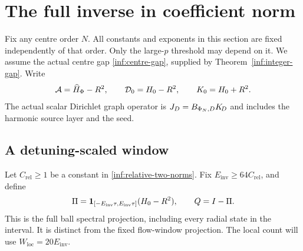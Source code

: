 \section{The full inverse in coefficient norm}\label{inf:sec-inverse}

Fix any centre order $N$. All constants and exponents in this section are fixed
independently of that order. Only the large-$p$ threshold may
depend on it. We assume the actual centre gap
\eqref{inf:centre-gap}, supplied by Theorem~\ref{inf:integer-gap}.
Write
\[
 \mathcal A=\widehat H_\Phi-R^2,\qquad \mathcal D_0=H_0-R^2,
 \qquad K_0=H_0+R^2.
\]
The actual scalar Dirichlet graph operator is
$J_D=B_{\Phi_N,D}K_{\!D}$ and includes the harmonic source layer and
the seed.

\subsection{A detuning-scaled window}

Let $C_{\mathrm{rel}}\ge1$ be a constant in
\eqref{inf:relative-two-norms}. Fix
$E_{\mathrm{inv}}\ge64C_{\mathrm{rel}}$, and define
\begin{equation}\label{inf:inverse-window}
 \Pi=\mathbf{1}_{[-E_{\mathrm{inv}}\tau,E_{\mathrm{inv}}\tau]}
                                    (H_0-R^2),\qquad Q=I-\Pi.
\end{equation}
This is the full ball spectral projection, including every radial
state in the interval. It is distinct from the fixed flow-window
projection. The local count will use
$W_{\mathrm{loc}}=20E_{\mathrm{inv}}$.

